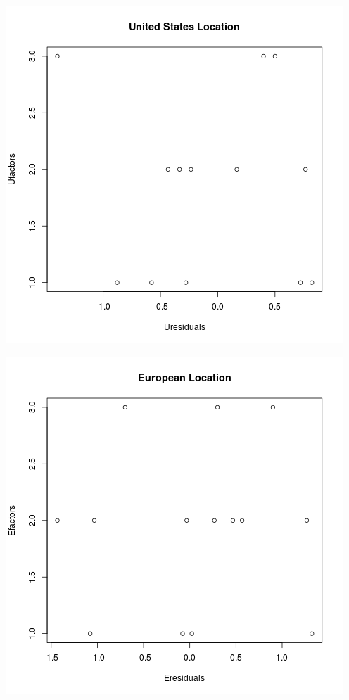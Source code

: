 \documentclass[11pt]{article}
\begin{document}
\includegraphics[width=.9\linewidth]{USplot.png}

\includegraphics[width=.9\linewidth]{Europeanplot.png}
\end{document}
